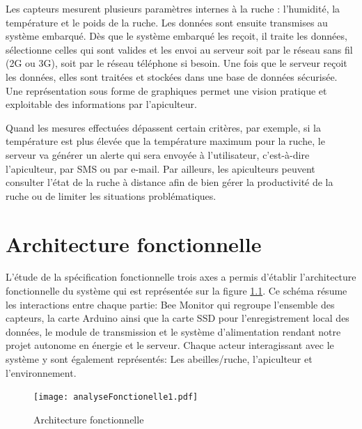 Les capteurs mesurent plusieurs paramètres internes à la ruche : l'humidité, la température et le poids de la ruche. Les données sont ensuite transmises au système embarqué. Dès que le système embarqué les reçoit, il traite les données, sélectionne celles qui sont valides et les envoi au serveur soit par le réseau sans fil (2G ou 3G), soit par le réseau téléphone si besoin. Une fois que le serveur reçoit les données, elles sont traitées et stockées dans une base de données sécurisée. Une représentation sous forme de graphiques permet une vision pratique et exploitable des informations par l'apiculteur.

Quand les mesures effectuées dépassent certain critères, par exemple, si la température est plus élevée que la température maximum pour la ruche, le serveur va générer un alerte qui sera envoyée à l'utilisateur, c’est-à-dire l'apiculteur, par SMS ou par e-mail. Par ailleurs, les apiculteurs peuvent consulter l’état de la ruche à distance afin de bien gérer la productivité de la ruche ou de limiter les situations problématiques. 

\pagebreak

\chapter{Architecture fonctionnelle}

L'étude de la spécification fonctionnelle trois axes a permis d'établir l'architecture fonctionnelle du système qui est représentée sur la figure \ref{fig:anaFonc}.
Ce schéma résume les interactions entre chaque partie: Bee Monitor qui regroupe l'ensemble des capteurs, la carte Arduino ainsi que la carte SSD pour l'enregistrement local des données, le module de transmission et le système d'alimentation rendant notre projet autonome en énergie et le serveur. Chaque acteur interagissant avec le système y sont également représentés: Les abeilles/ruche, l'apiculteur et l'environnement.   
  

\begin{figure}[h]
\centering\texttt{[image: analyseFonctionelle1.pdf]}
\caption{\label{fig:anaFonc} Architecture fonctionnelle}
\end{figure}    

